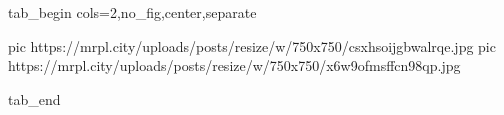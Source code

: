  
 
 
 
 


\ifcmt
  tab_begin cols=2,no_fig,center,separate

     pic https://mrpl.city/uploads/posts/resize/w/750x750/csxhsoijgbwalrqe.jpg
		 pic https://mrpl.city/uploads/posts/resize/w/750x750/x6w9ofmsffcn98qp.jpg

  tab_end
\fi
